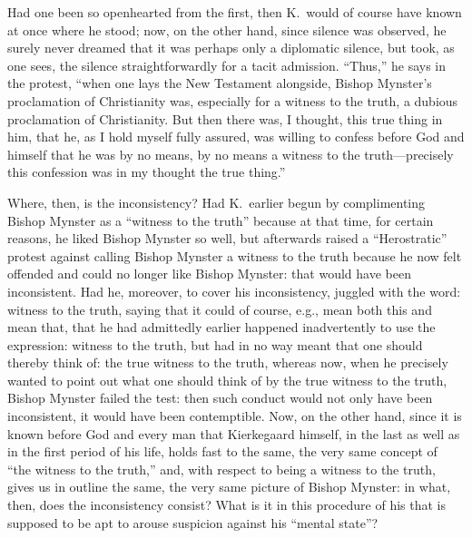 \documentclass[12pt,a4paper]{article}
\newcommand{\opage}[1]{\marginnote{\footnotesize\textit{[#1]}}}
\begin{document}
Had one been so openhearted from the first, then
K.\ would of course have known at once where he stood; now, on the other hand,
since silence was observed, he surely never dreamed that
it was perhaps only a diplomatic silence, but took,
as one sees, the silence straightforwardly for a tacit
admission.
``Thus,'' he says in the protest, ``when
one lays the New Testament alongside, Bishop Mynster's
proclamation of Christianity was, especially for a witness to the truth,
a dubious proclamation of Christianity. But then there was, I
thought, this true thing in him, that he, as I hold myself
fully assured, was willing to confess before God and
himself that he was by no means, by no means a witness to the
truth---precisely this confession was in my thought the
true thing.''

Where, then, is the inconsistency? Had K.\ earlier
begun by complimenting Bishop Mynster as a ``witness
to the truth'' because at that time, for certain reasons, he liked
Bishop Mynster so well, but afterwards raised a ``Herostratic''
protest against calling Bishop Mynster a witness to the
truth because he now felt offended and could no longer
like Bishop Mynster: that would have been inconsistent.
Had he, moreover, to cover his inconsistency,
juggled with the word: witness to the truth, saying that it could of course, e.g., mean
both this and mean that, that he had admittedly
earlier happened inadvertently to use the expression:
witness to the truth, but had in no way meant
that one should thereby think of: the true witness to the truth,
whereas now, when he precisely wanted to point out what one should
think of by the true witness to the truth, Bishop
Mynster failed the test: then such conduct would not
only have been inconsistent, it would have been contemptible.
Now, on the other hand, since it is known before God and every man
that Kierkegaard himself, in the last as well as in the first period of
his life, holds fast to the same, the very same concept of
\opage{21}``the witness to the truth,'' and, with respect to being a witness to the
truth, gives us in outline the same, the very same
picture of Bishop Mynster: in what, then, does the
inconsistency consist? What is it in this procedure of his
that is supposed to be apt to arouse suspicion against his
``mental state''?
\end{document}
